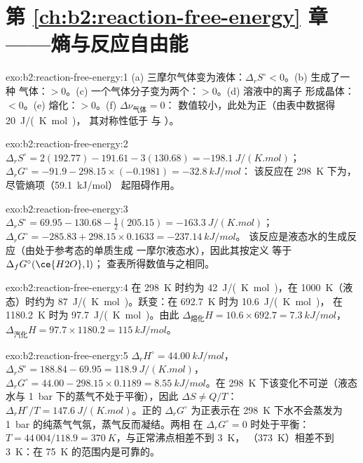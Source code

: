 \section*{第 \ref{ch:b2:reaction-free-energy} 章——熵与反应自由能}

\begin{solution}{exo:b2:reaction-free-energy:1}
(a) 三摩尔气体变为液体：$\Delta_r S^\circ < 0$。(b) 生成了一种
气体：$> 0$。(c) 一个气体分子变为两个：$> 0$。(d) 溶液中的离子
形成晶体：$< 0$。(e) 熔化：$> 0$。(f) $\Delta\nu_{\text{气体}} = 0$：
数值较小，此处为正（由表中数据得 \qty{+20}{J/(K.mol)}，
其对称性低于  与 ）。
\end{solution}

\begin{solution}{exo:b2:reaction-free-energy:2}
$\Delta_r S^\circ = 2(192.77) - 191.61 - 3(130.68) = \qty{-198.1}{J/(K.mol)}$；
$\Delta_r G^\circ = -91.9 - 298.15 \times (-0.1981) = \qty{-32.8}{kJ/mol}$：
该反应在 \qty{298}{K} 下为，尽管熵项（\qty{+59.1}{kJ/mol}）
起阻碍作用。
\end{solution}

\begin{solution}{exo:b2:reaction-free-energy:3}
$\Delta_r S^\circ = 69.95 - 130.68 - \tfrac12(205.15) = \qty{-163.3}{J/(K.mol)}$；
$\Delta_r G^\circ = -285.83 + 298.15 \times 0.1633 = \qty{-237.14}{kJ/mol}$。
该反应是液态水的生成反应（由处于参考态的单质生成
一摩尔液态水），因此其按定义
等于 $\Delta_f G^\circ(\ce{H2O}, \text{l})$；
查表所得数值与之相同。
\end{solution}

\begin{solution}{exo:b2:reaction-free-energy:4}
在 \qty{298}{K} 时约为 \qty{42}{J/(K.mol)}，在
\qty{1000}{K}（液态）时约为 \qty{87}{J/(K.mol)}。跃变：在 \qty{692.7}{K} 时为 \qty{10.6}{J/(K.mol)}，
在 \qty{1180.2}{K} 时为 \qty{97.7}{J/(K.mol)}。由此 $\Delta_{\text{熔化}}H = 10.6 \times
692.7 = \qty{7.3}{kJ/mol}$，$\Delta_{\text{汽化}}H = 97.7 \times 1180.2 =
\qty{115}{kJ/mol}$。
\end{solution}

\begin{solution}{exo:b2:reaction-free-energy:5}
$\Delta_r H^\circ = \qty{44.00}{kJ/mol}$，$\Delta_r S^\circ = 188.84 - 69.95 =
\qty{118.9}{J/(K.mol)}$，$\Delta_r G^\circ = 44.00 - 298.15 \times 0.1189 =
\qty{+8.55}{kJ/mol}$。在 \qty{298}{K} 下该变化不可逆（液态
水与 \qty{1}{bar} 下的蒸气不处于平衡），因此 $\Delta S \ne
Q/T$：$\Delta_r H^\circ/T = \qty{147.6}{J/(K.mol)}$。正的
$\Delta_r G^\circ$ 为正表示在 \qty{298}{K} 下水不会蒸发为
\qty{1}{bar} 的纯蒸气气氛，蒸气反而凝结。两相
在 $\Delta_r G^\circ = 0$ 时处于平衡：$T = 44\,004/118.9 =
\qty{370}{K}$，与正常沸点相差不到 \qty{3}{K}，
（\qty{373}{K}）相差不到 \qty{3}{K}：在 \qty{75}{K} 的范围内是可靠的。
\end{solution}

